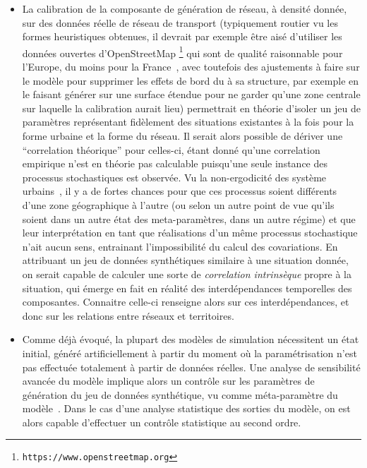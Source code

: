 {\begin{itemize}
\end{itemize}
}{
\begin{itemize}
\item La calibration de la composante de génération de réseau, à densité donnée, sur des données réelle de réseau de transport (typiquement routier vu les formes heuristiques obtenues, il devrait par exemple être aisé d'utiliser les données ouvertes d'OpenStreetMap 
\footnote{\texttt{https://www.openstreetmap.org}} qui sont de qualité raisonnable pour l'Europe, du moins pour la France~\cite{girres2010quality}, avec toutefois des ajustements à faire sur le modèle pour supprimer les effets de bord du à sa structure, par exemple en le faisant générer sur une surface étendue pour ne garder qu'une zone centrale sur laquelle la calibration aurait lieu) permettrait en théorie d'isoler un jeu de paramètres représentant fidèlement des situations existantes à la fois pour la forme urbaine et la forme du réseau. Il serait alors possible de dériver une ``correlation théorique'' pour celles-ci, étant donné qu'une correlation empirique n'est en théorie pas calculable puisqu'une seule instance des processus stochastiques est observée. Vu la non-ergodicité des système urbains~\cite{pumain2012urban}, il y a de fortes chances pour que ces processus soient différents d'une zone géographique à l'autre (ou selon un autre point de vue qu'ils soient dans un autre état des meta-paramètres, dans un autre régime) et que leur interprétation en tant que réalisations d'un même processus stochastique n'ait aucun sens, 
 entrainant l'impossibilité du calcul des covariations. En attribuant un jeu de données synthétiques similaire à une situation donnée, on serait capable de calculer une sorte de \emph{correlation intrinsèque} propre à la situation, qui émerge en fait en réalité des interdépendances temporelles des composantes. Connaitre celle-ci renseigne alors sur ces interdépendances, et donc sur les relations entre réseaux et territoires.
\item Comme déjà évoqué, la plupart des modèles de simulation nécessitent un état initial, généré artificiellement à partir du moment où la paramétrisation n'est pas effectuée totalement à partir de données réelles. Une analyse de sensibilité avancée du modèle implique alors un contrôle sur les paramètres de génération du jeu de données synthétique, vu comme méta-paramètre du modèle~\cite{cottineau2015revisiting}. Dans le cas d'une analyse statistique des sorties du modèle, on est alors capable d'effectuer un contrôle statistique au second ordre.

\end{itemize}}
